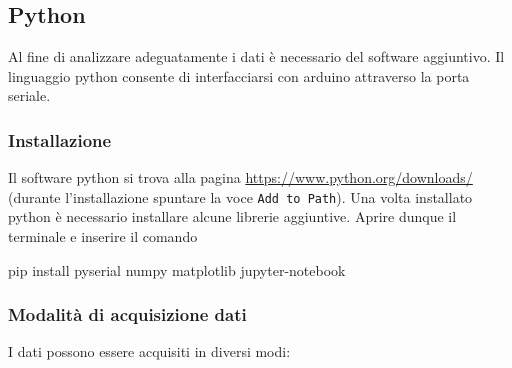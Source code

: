\documentclass[11pt]{article}
\newenvironment{Shaded}{}{}
\newcommand{\NormalTok}[1]{{#1}}
\newcommand{\ExtensionTok}[1]{{#1}}
\begin{document}
    \hypertarget{python}{%
\subsection{Python}\label{python}}

Al fine di analizzare adeguatamente i dati è necessario del software
aggiuntivo. Il linguaggio python consente di interfacciarsi con arduino
attraverso la porta seriale.

\hypertarget{installazione}{%
\subsubsection{Installazione}\label{installazione}}

Il software python si trova alla pagina
\url{https://www.python.org/downloads/} (durante l'installazione spuntare la
voce \texttt{Add\ to\ Path}). Una volta installato python è necessario
installare alcune librerie aggiuntive. Aprire dunque il terminale e
inserire il comando

\begin{Shaded}
\begin{Highlighting}[]
\ExtensionTok{pip}\NormalTok{ install pyserial numpy matplotlib jupyter-notebook}
\end{Highlighting}
\end{Shaded}

\hypertarget{modalituxe0-di-acquisizione-dati}{%
\subsubsection{Modalità di acquisizione
dati}\label{modalituxe0-di-acquisizione-dati}}

I dati possono essere acquisiti in diversi modi:
\end{document}
